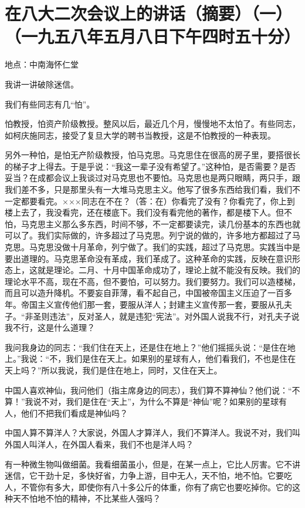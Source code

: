 \section[在八大二次会议上的讲话（摘要）（一）（一九五八年五月八日下午四时五十分）]{在八大二次会议上的讲话（摘要）（一）（一九五八年五月八日下午四时五十分）}


地点：中南海怀仁堂

我讲一讲破除迷信。

我们有些同志有几“怕”。

怕教授，怕资产阶级教授。整风以后，最近几个月，慢慢地不太怕了。有些同志，如柯庆施同志，接受了复旦大学的聘书当教授，这是不怕教授的一种表现。

另外一种怕，是怕无产阶级教授，怕马克思。马克思住在很高的房子里，要搭很长的梯子才上得去。于是乎说：“我这一辈子没有希望了。”这种怕，是否需要？是否妥当？在成都会议上我谈过对马克思也不要怕。马克思也是两只眼睛，两只手，跟我们差不多，只是那里头有一大堆马克思主义。他写了很多东西给我们看，我们不一定都要看完。×××同志在不在？（答：在）你看完了没有？你看完了，你上到楼上去了，我没看完，还在楼底下。我们没有看完他的著作，都是楼下人。但不怕，马克思主义那么多东西，时间不够，不一定都要读完，读几份基本的东西也就可以了。我们实际做的，许多超过了马克思。列宁说的做的，许多地方都超过了马克思。马克思没做十月革命，列宁做了。我们的实践，超过了马克思。实践当中是要出道理的。马克思革命没有革成，我们革成了。这种革命的实践，反映在意识形态上，这就是理论。二月、十月中国革命成功了，理论上就不能没有反映。我们的理论水平不高，现在不高，但不要怕，可以努力。我们要努力。我们可以造楼梯，而且可以造升降机。不要妄自菲薄，看不起自己，中国被帝国主义压迫了一百多年。帝国主义宣传他们那一套，要服从洋人；封建主义宣传那一套，要服从孔夫子。“非圣则违法”，反对圣人，就是违犯“宪法”。对外国人说我不行，对孔夫子说我不行，这是什么道理？

我问我身边的同志：“我们住在天上，还是住在地上？”他们摇摇头说：“是住在地上。”我说：“不，我们是住在天上。如果别的星球有人，他们看我们，不也是住在天上吗？”所以我说，我们是住在地上，同时，又住在天上。

中国人喜欢神仙，我问他们（指主席身边的同志），我们算不算神仙？他们说：“不算！”我说不对，我们是住在“天上”，为什么不算是“神仙”呢？如果别的星球有人，他们不把我们看成是神仙吗？

中国人算不算洋人？大家说，外国人才算洋人，我们不算洋人。我说不对，我们叫外国人叫洋人，在外国人看来，我们不也是洋人吗？

有一种微生物叫做细菌。我看细菌虽小，但是，在某一点上，它比人厉害。它不讲迷信，它干劲十足，多快好省，力争上游，目中无人，天不怕，地不怕。它要吃人，不管你有多大，即使你有八十多公斤的体重，你有了病它也要吃掉你。它的这种天不怕地不怕的精神，不比某些人强吗？

